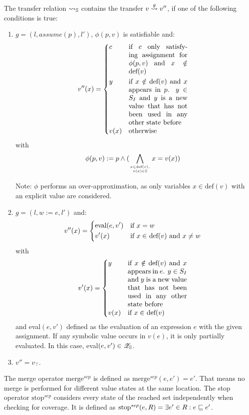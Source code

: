 The transfer relation $\rightsquigarrow_{\mathbb{S}}$ contains the transfer $v \overset{g}{\rightsquigarrow} v''$, if one of the following conditions is true:
    \begin{enumerate}[1.]
      \item $g = (l, assume(p), l')$, $\phi (p, v)$ is satisfiable and:
        \[
          v''(x) = \begin{dcases}
            c    & \parbox[t]{.25\textwidth}{if $c$ only satisfying assignment for $\phi (p, v)$ and $x \notin$ def$(v)$}\\
            y    & \parbox[t]{.25\textwidth}{if $x \notin \text{def}(v)$ and $x$ appears in $p$. $y \in S_I$ and $y$ is a new value that has not been used in any other state before}\\
            v(x) & \text{otherwise}              
          \end{dcases}
        \]
        with \[\phi (p, v) := p \wedge (\displaystyle\bigwedge_{x \in \text{def}(v),\atop {v(x) \in \mathbb{Z}}} x = v(x))\]

        Note: $\phi$ performs an over-approximation, as only variables $x \in \text{def}(v)$ with an explicit value are considered.

      \item $g = (l, w := e, l')$ and:
        \[
          v''(x) = \begin{dcases}
            \text{eval}(e, v') & \text{if $x = w$} \\
            v'(x)       & \text{if $x \in$ def$(v)$ and $x \neq w$}
          \end{dcases}
        \]
      with \[
         v'(x) = \begin{dcases}
            y    & \parbox[t]{.25\textwidth}{if $x \notin \text{def}(v)$ and $x$ appears in $e$. $y \in S_I$ and $y$ is a new value that has not been used in any other state before}\\
            v(x) & \text{if $x \in$ def$(v)$}
          \end{dcases}
      \]
      and eval$(e, v')$ defined as the evaluation of an expression $e$ with the given assignment.
      If any symbolic value occurs in $v(e)$, it is only partially evaluated. In this case, eval$(e, v') \in \mathscr{Z}_{\mathbb{S}}$.

      \item $v'' = v_\top$.
    \end{enumerate}
The merge operator $\text{merge}^{sep}$ is defined as $\text{merge}^{sep}(e, e') = e'$.
That means no merge is performed for different value states at the same location.
The stop operator $\text{stop}^{sep}$ considers every state of the reached set independently when checking for coverage.
It is defined as $\text{stop}^{sep}(e, R) = \exists e' \in R: e \sqsubseteq e'$.
